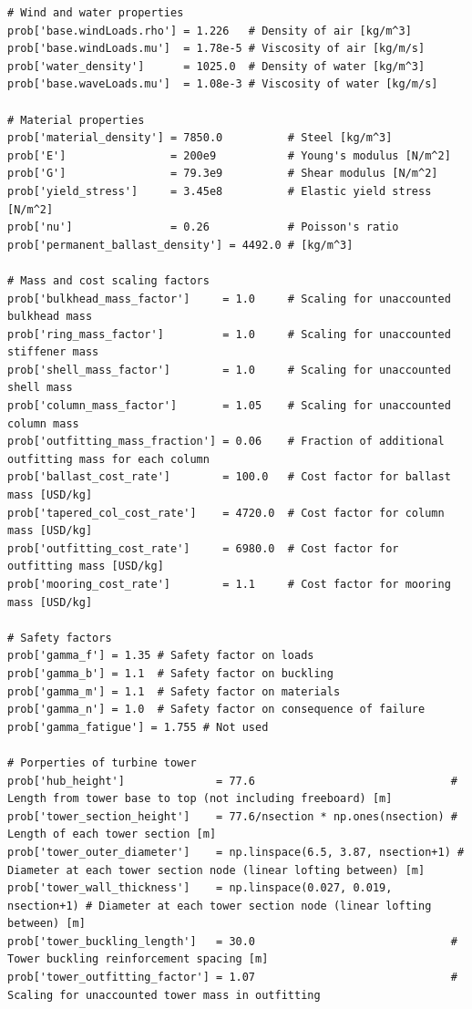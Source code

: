 \begin{lstlisting}
# Wind and water properties
prob['base.windLoads.rho'] = 1.226   # Density of air [kg/m^3]
prob['base.windLoads.mu']  = 1.78e-5 # Viscosity of air [kg/m/s]
prob['water_density']      = 1025.0  # Density of water [kg/m^3]
prob['base.waveLoads.mu']  = 1.08e-3 # Viscosity of water [kg/m/s]

# Material properties
prob['material_density'] = 7850.0          # Steel [kg/m^3]
prob['E']                = 200e9           # Young's modulus [N/m^2]
prob['G']                = 79.3e9          # Shear modulus [N/m^2]
prob['yield_stress']     = 3.45e8          # Elastic yield stress [N/m^2]
prob['nu']               = 0.26            # Poisson's ratio
prob['permanent_ballast_density'] = 4492.0 # [kg/m^3]

# Mass and cost scaling factors
prob['bulkhead_mass_factor']     = 1.0     # Scaling for unaccounted bulkhead mass
prob['ring_mass_factor']         = 1.0     # Scaling for unaccounted stiffener mass
prob['shell_mass_factor']        = 1.0     # Scaling for unaccounted shell mass
prob['column_mass_factor']       = 1.05    # Scaling for unaccounted column mass
prob['outfitting_mass_fraction'] = 0.06    # Fraction of additional outfitting mass for each column
prob['ballast_cost_rate']        = 100.0   # Cost factor for ballast mass [USD/kg]
prob['tapered_col_cost_rate']    = 4720.0  # Cost factor for column mass [USD/kg]
prob['outfitting_cost_rate']     = 6980.0  # Cost factor for outfitting mass [USD/kg]
prob['mooring_cost_rate']        = 1.1     # Cost factor for mooring mass [USD/kg]

# Safety factors
prob['gamma_f'] = 1.35 # Safety factor on loads
prob['gamma_b'] = 1.1  # Safety factor on buckling
prob['gamma_m'] = 1.1  # Safety factor on materials
prob['gamma_n'] = 1.0  # Safety factor on consequence of failure
prob['gamma_fatigue'] = 1.755 # Not used

# Porperties of turbine tower
prob['hub_height']              = 77.6                              # Length from tower base to top (not including freeboard) [m]
prob['tower_section_height']    = 77.6/nsection * np.ones(nsection) # Length of each tower section [m]
prob['tower_outer_diameter']    = np.linspace(6.5, 3.87, nsection+1) # Diameter at each tower section node (linear lofting between) [m]
prob['tower_wall_thickness']    = np.linspace(0.027, 0.019, nsection+1) # Diameter at each tower section node (linear lofting between) [m]
prob['tower_buckling_length']   = 30.0                              # Tower buckling reinforcement spacing [m]
prob['tower_outfitting_factor'] = 1.07                              # Scaling for unaccounted tower mass in outfitting


\end{lstlisting}
